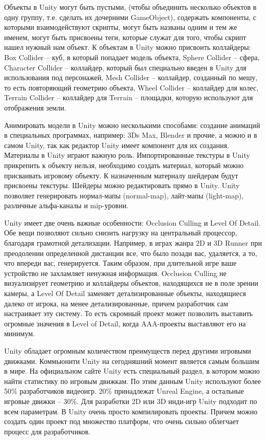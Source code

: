 Объекты в Unity могут быть пустыми, (чтобы объединить несколько объектов в одну группу, т.е. сделать их дочерними GameObject), содержать компоненты, с которыми взаимодействуют скрипты, могут быть названы одним и тем же именем, могут быть присвоены теги, которые служат для того, чтобы скрипт нашел нужный нам объект. К объектам в Unity можно присвоить коллайдеры: Box Collider -- куб, в который попадает модель объекта, Sphere Collider -- сфера, Character Collider -- коллайдер, который был специально введен в Unity для использования под персонажей, Mesh Collider -- коллайдер, созданный по мешу, то есть повторяющий геометрию объекта, Wheel Collider -- коллайдер для колес, Terrain Collider -- коллайдер для Terrain -- площадки, которую используют для отображения земли.

Анимировать модели в Unity можно несколькими способами: создание анимаций в специальных программах, например: 3Ds Max, Blender и прочие, а можно и в самом Unity, так как редактор Unity имеет компонент для их создания. Материалы в Unity играют важную роль. Импортированные текстуры в Unity прикрепить к объекту нельзя, необходимо создать материал, который можно присваивать игровому объекту. К назначенным материалу шейдерам будут присвоены текстуры. Шейдеры можно редактировать прямо в Unity. Unity позволяет
генерировать нормал-мапы (normal-map), лайт-мапы (light-map), различные альфа-каналы и mip-уровни.

Unity имеет две очень важные особенности: Occlusion Culling и Level Of Detail. Обе вещи позволяют сильно снизить нагрузку на центральный процессор, благодаря грамотной детализации. Например, в играх жанра 2D и 3D Runner при преодолении определенной дистанции все, что было позади вас, удаляется, а то, что впереди вас, генерируется. Таким образом, при длительной игре ваше устройство не захламляет ненужная информация. Occlusion Culling не визуализирует геометрию и коллайдеры объектов, находящихся не в поле зрении камеры, а Level Of Detail заменяет детализированные объекты, находящиеся далеко от игрока, на менее детализированные, причем разработчик сам настраивает эту систему. То есть скромный проект может позволить выставить огромные значения в Level of Detail, когда AAA-проекты выставляют его на минимум.

Unity обладает огромным количеством преимуществ перед другими игровыми движками. Коммьюнити Unity на сегодняшний момент является самым большим в мире. На официальном сайте Unity есть специальный раздел, в котором можно найти статистику по игровым движкам. По этим данным Unity используют более 50\% разработчиков видеоигр. 20\% принадлежат Unreal Engine, а остальные игровые движки -- 30\%. Для разработки 2D или 3D инди-игр Unity подходит по всем параметрам. В Unity очень просто компилировать проекты. Причем можно создать один проект под множество платформ, что очень сильно облегчает процесс для разработчиков.


